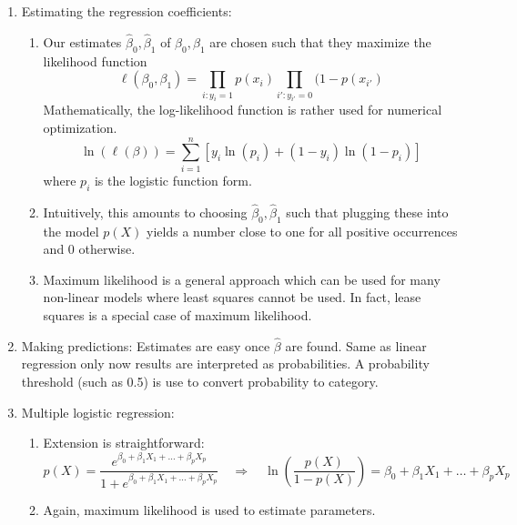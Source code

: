 \documentclass{article}
\begin{document}
\begin{enumerate}
\item Estimating the regression coefficients:
\begin{enumerate}
\item Our estimates $\hat{\beta}_0, \hat{\beta}_1$ of $\beta_0, \beta_1$ are chosen such that they maximize the likelihood function
\[
\ell(\beta_0, \beta_1) = \prod_{i: y_i=1} p(x_i) \prod_{i' : y_{i'}=0} (1-p(x_{i'})
\]
Mathematically, the log-likelihood function is rather used for numerical optimization.
\[
\ln(\ell(\beta)) = \sum_{i=1}^n \left[ y_i \ln(p_i) + (1-y_i)\ln(1-p_i) \right]
\]
where $p_i$ is the logistic function form.
\item Intuitively, this amounts to choosing $\hat{\beta}_0, \hat{\beta}_1$ such that plugging these into the model $p(X)$ yields a number close to one for all positive occurrences and 0 otherwise.
\item Maximum likelihood is a general approach which can be used for many non-linear models where least squares cannot be used. In fact, lease squares is a special case of maximum likelihood.
\end{enumerate}

\item Making predictions: Estimates are easy once $\hat{\beta}$ are found. Same as linear regression only now results are interpreted as probabilities. A probability threshold (such as 0.5) is use to convert probability to category.

\item Multiple logistic regression:
\begin{enumerate}
\item Extension is straightforward:
\[
p(X) = \frac{e^{\beta_0 + \beta_1 X_1 + \dots + \beta_p X_p}}{1+e^{\beta_0 + \beta_1 X_1 + \dots + \beta_p X_p}} \quad \Rightarrow \quad \ln\left( \frac{p(X)}{1-p(X)} \right) = \beta_0 + \beta_1 X_1 + \dots + \beta_p X_p
\]
\item Again, maximum likelihood is used to estimate parameters.
\end{enumerate}


\end{enumerate}
\end{document}
